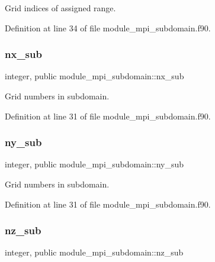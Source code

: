 Grid indices of assigned range. 



Definition at line 34 of file module\+\_\+mpi\+\_\+subdomain.\+f90.

\mbox{\label{namespacemodule__mpi__subdomain_ac0a0da3865fce334d01c602c949a680f}} 
\subsubsection{\texorpdfstring{nx\_sub}{nx\_sub}}
{\footnotesize\ttfamily integer, public module\+\_\+mpi\+\_\+subdomain\+::nx\+\_\+sub}



Grid numbers in subdomain. 



Definition at line 31 of file module\+\_\+mpi\+\_\+subdomain.\+f90.

\mbox{\label{namespacemodule__mpi__subdomain_a337008dffc01586ae3a149d255115e30}} 
\subsubsection{\texorpdfstring{ny\_sub}{ny\_sub}}
{\footnotesize\ttfamily integer, public module\+\_\+mpi\+\_\+subdomain\+::ny\+\_\+sub}



Grid numbers in subdomain. 



Definition at line 31 of file module\+\_\+mpi\+\_\+subdomain.\+f90.

\mbox{\label{namespacemodule__mpi__subdomain_a6df401547925214a36e4aaf656380a48}} 
\subsubsection{\texorpdfstring{nz\_sub}{nz\_sub}}
{\footnotesize\ttfamily integer, public module\+\_\+mpi\+\_\+subdomain\+::nz\+\_\+sub}




